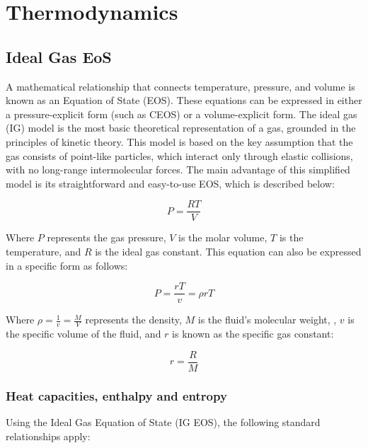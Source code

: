 \chapter{ Thermodynamics}
\chaptertoc{}

\section{Ideal Gas EoS}

A mathematical relationship that connects temperature, pressure, and volume is
known as an Equation of State (EOS). These equations can be expressed in either
a pressure-explicit form (such as CEOS) or a volume-explicit form. The ideal gas
(IG) model is the most basic theoretical representation of a gas, grounded in
the principles of kinetic theory. This model is based on the key assumption that
the gas consists of point-like particles, which interact only through elastic
collisions, with no long-range intermolecular forces. The main advantage of this
simplified model is its straightforward and easy-to-use EOS, which is described
below:

\begin{equation}
	P = \frac{RT}{V}
\end{equation}

Where $P$ represents the gas pressure, $V$ is the molar volume, $T$ is the
temperature, and $R$ is the ideal gas constant. This equation can also be
expressed in a specific form as follows:

\begin{equation}
	P = \frac{rT}{v} = \rho rT
\end{equation}

Where $\rho = \frac{1}{v}=\frac{M}{V}$ represents the density, $M$ is the fluid's molecular weight, , $v$ is the specific volume of the fluid, and $r$ is known as the specific gas constant:

\begin{equation}
	r = \frac{R}{M}
\end{equation}

	\subsection{Heat capacities, enthalpy and entropy}

	Using the Ideal Gas Equation of State (IG EOS), the following standard
	relationships apply:
	
